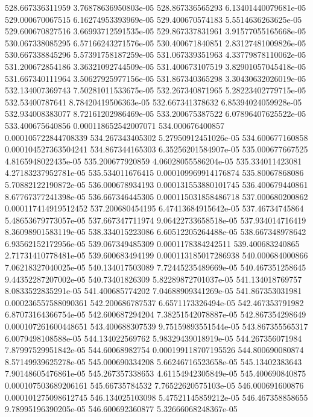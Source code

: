 {528.667336311959 3.76878636950803e-05
528.867336565293 6.13401440079681e-05
529.000670067515 6.16274953393969e-05
529.400670574183 5.5514636263625e-05
529.600670827516 3.66993712591535e-05
529.867337831961 3.91577055165668e-05
530.067338085295 6.57166243271576e-05
530.400671840851 2.83127481009826e-05
530.667338845296 5.57391758187259e-05
531.067339351963 4.33779878110062e-05
531.200672854186 3.36321092744509e-05
531.400673107519 3.82901057045418e-05
531.667340111964 3.50627925977156e-05
531.867340365298 3.30430632026019e-05
532.134007369743 7.50281011533675e-05
532.267340871965 5.28223402779715e-05
532.53400787641 8.78420419506363e-05
532.667341378632 6.85394024059928e-05
532.934008383077 8.72161202986469e-05
533.200675387522 6.07896407625522e-05
533.400675640856 0.000118652542007071
534.000676400857 0.000105722844708339
534.267343405302 5.27950912451026e-05
534.600677160858 0.000104527363504241
534.867344165303 6.35256201584907e-05
535.000677667525 4.8165948022435e-05
535.200677920859 4.06028055586204e-05
535.334011423081 4.27183237952781e-05
535.534011676415 0.000109969914176874
535.80067868086 5.70882122190872e-05
536.000678934193 0.000131553880101745
536.400679440861 8.67767377241398e-05
536.667346445305 0.000115031858486718
537.000680200862 0.000117414919512452
537.200680454195 6.47413684915642e-05
537.46734745864 5.48653679773057e-05
537.667347711974 9.06422733658518e-05
537.934014716419 8.36098901583119e-05
538.334015223086 6.60512205264488e-05
538.667348978642 6.93562152172956e-05
539.067349485309 0.0001178384242511
539.400683240865 2.71731410778481e-05
539.600683494199 0.000113185017286938
540.000684000866 7.06218327040025e-05
540.134017503089 7.72445235489669e-05
540.467351258645 9.44352287207002e-05
540.73401826309 5.82289872701037e-05
541.134018769757 8.0833522835291e-05
541.400685774202 7.04688909341269e-05
541.867353031981 0.000236557588090361
542.200686787537 6.6571173326494e-05
542.467353791982 6.87073164366754e-05
542.600687294204 7.38251542078887e-05
542.867354298649 0.000107261600448651
543.400688307539 9.75159893551544e-05
543.867355565317 6.0079498108588e-05
544.134022569762 5.98329439018919e-05
544.267356071984 7.87997529951842e-05
544.60068982754 0.000199118707195526
544.800690080874 8.57149939625278e-05
545.000690334208 5.66246716523658e-05
545.13402383643 7.90148605476861e-05
545.267357338653 4.61154942305849e-05
545.400690840875 0.000107503689206161
545.66735784532 7.76522620575103e-05
546.000691600876 0.000101275098612745
546.134025103098 5.47521145859212e-05
546.467358858655 9.78995196390205e-05
546.600692360877 5.32666068248367e-05
}
